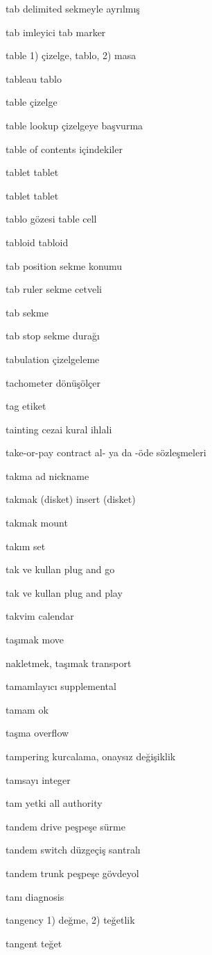 \documentclass[12pt,fleqn]{article}\usepackage{../../common}
\begin{document}
tab delimited sekmeyle ayrılmış

tab imleyici tab marker

table 1) çizelge, tablo, 2) masa

tableau tablo

table çizelge

table lookup çizelgeye başvurma

table of contents içindekiler

tablet tablet

tablet tablet

tablo gözesi table cell

tabloid tabloid

tab position sekme konumu

tab ruler sekme cetveli

tab sekme

tab stop sekme durağı

tabulation çizelgeleme

tachometer dönüşölçer

tag etiket

tainting cezai kural ihlali

take-or-pay contract al- ya da -öde sözleşmeleri

takma ad nickname

takmak (disket) insert (disket)

takmak mount

takım set

tak ve kullan plug and go

tak ve kullan plug and play

takvim calendar

taşımak move

nakletmek, taşımak transport

tamamlayıcı supplemental

tamam ok

taşma overflow

tampering kurcalama, onaysız değişiklik

tamsayı integer

tam yetki all authority

tandem drive peşpeşe sürme

tandem switch düzgeçiş santralı

tandem trunk peşpeşe gövdeyol

tanı diagnosis

tangency 1) değme, 2) teğetlik

tangent teğet
\end{document}
